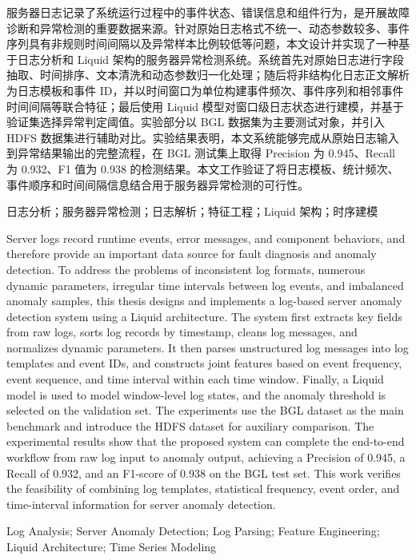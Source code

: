 \begin{abstractCN}
    服务器日志记录了系统运行过程中的事件状态、错误信息和组件行为，是开展故障诊断和异常检测的重要数据来源。针对原始日志格式不统一、动态参数较多、事件序列具有非规则时间间隔以及异常样本比例较低等问题，本文设计并实现了一种基于日志分析和 Liquid 架构的服务器异常检测系统。系统首先对原始日志进行字段抽取、时间排序、文本清洗和动态参数归一化处理；随后将非结构化日志正文解析为日志模板和事件 ID，并以时间窗口为单位构建事件频次、事件序列和相邻事件时间间隔等联合特征；最后使用 Liquid 模型对窗口级日志状态进行建模，并基于验证集选择异常判定阈值。实验部分以 BGL 数据集为主要测试对象，并引入 HDFS 数据集进行辅助对比。实验结果表明，本文系统能够完成从原始日志输入到异常结果输出的完整流程，在 BGL 测试集上取得 Precision 为 0.945、Recall 为 0.932、F1 值为 0.938 的检测结果。本文工作验证了将日志模板、统计频次、事件顺序和时间间隔信息结合用于服务器异常检测的可行性。

    \keywordsCN 日志分析；服务器异常检测；日志解析；特征工程；Liquid 架构；时序建模
\end{abstractCN}

\begin{abstractENG}
    Server logs record runtime events, error messages, and component behaviors, and therefore provide an important data source for fault diagnosis and anomaly detection. To address the problems of inconsistent log formats, numerous dynamic parameters, irregular time intervals between log events, and imbalanced anomaly samples, this thesis designs and implements a log-based server anomaly detection system using a Liquid architecture. The system first extracts key fields from raw logs, sorts log records by timestamp, cleans log messages, and normalizes dynamic parameters. It then parses unstructured log messages into log templates and event IDs, and constructs joint features based on event frequency, event sequence, and time interval within each time window. Finally, a Liquid model is used to model window-level log states, and the anomaly threshold is selected on the validation set. The experiments use the BGL dataset as the main benchmark and introduce the HDFS dataset for auxiliary comparison. The experimental results show that the proposed system can complete the end-to-end workflow from raw log input to anomaly output, achieving a Precision of 0.945, a Recall of 0.932, and an F1-score of 0.938 on the BGL test set. This work verifies the feasibility of combining log templates, statistical frequency, event order, and time-interval information for server anomaly detection.

    \keywordsENG Log Analysis; Server Anomaly Detection; Log Parsing; Feature Engineering; Liquid Architecture; Time Series Modeling
\end{abstractENG}
